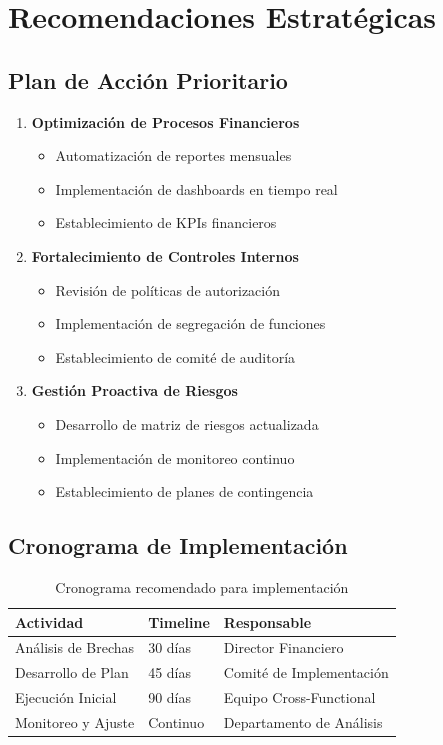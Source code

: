 \documentclass[11pt]{report}
\begin{document}
\chapter{Recomendaciones Estratégicas}

\section{Plan de Acción Prioritario}
\begin{enumerate}[label=\textbf{Objetivo Estratégico \arabic*:}, left=0pt]
    \item \textbf{Optimización de Procesos Financieros}
    \begin{itemize}
        \item Automatización de reportes mensuales
        \item Implementación de dashboards en tiempo real
        \item Establecimiento de KPIs financieros
    \end{itemize}
    
    \item \textbf{Fortalecimiento de Controles Internos}
    \begin{itemize}
        \item Revisión de políticas de autorización
        \item Implementación de segregación de funciones
        \item Establecimiento de comité de auditoría
    \end{itemize}
    
    \item \textbf{Gestión Proactiva de Riesgos}
    \begin{itemize}
        \item Desarrollo de matriz de riesgos actualizada
        \item Implementación de monitoreo continuo
        \item Establecimiento de planes de contingencia
    \end{itemize}
\end{enumerate}

\section{Cronograma de Implementación}
\begin{table}[H]
    \centering
    \begin{tabular}{p{}p{}p{}}
        \toprule
        \textbf{Actividad} & \textbf{Timeline} & \textbf{Responsable} \\
        \midrule
        Análisis de Brechas & 30 días & Director Financiero \\
        Desarrollo de Plan & 45 días & Comité de Implementación \\
        Ejecución Inicial & 90 días & Equipo Cross-Functional \\
        Monitoreo y Ajuste & Continuo & Departamento de Análisis \\
        \bottomrule
    \end{tabular}
    \caption{Cronograma recomendado para implementación}
\end{table}
\end{document}
